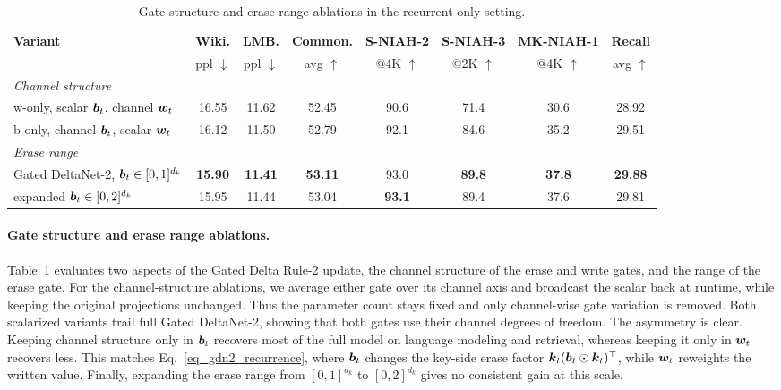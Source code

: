 \documentclass[10pt, logo, onecolumn, copyright]{nv}
\begin{document}
\begin{table}[t]
\centering
\footnotesize
\addtolength{\tabcolsep}{-1.5pt}
\begin{tabular}{l|cc|c|ccc|c}
\toprule
\textbf{Variant} & \textbf{Wiki.} & \textbf{LMB.} & \textbf{Common.} &
\textbf{S-NIAH-2} & \textbf{S-NIAH-3} & \textbf{MK-NIAH-1} & \textbf{Recall} \\
 & ppl $\downarrow$ & ppl $\downarrow$ & avg $\uparrow$ &
@4K $\uparrow$ & @2K $\uparrow$ & @4K $\uparrow$ & avg $\uparrow$ \\
\midrule
\multicolumn{8}{l}{\emph{Channel structure}} \\
w-only, scalar ${\bm{b}}_t$, channel ${\bm{w}}_t$   & 16.55 & 11.62 & 52.45 & 90.6 & 71.4 & 30.6 & 28.92 \\
b-only, channel ${\bm{b}}_t$, scalar ${\bm{w}}_t$   & 16.12 & 11.50 & 52.79 & 92.1 & 84.6 & 35.2 & 29.51 \\
\midrule
\multicolumn{8}{l}{\emph{Erase range}} \\
Gated DeltaNet-2, ${\bm{b}}_t \in [0,1]^{d_k}$     & \textbf{15.90} & \textbf{11.41} & \textbf{53.11} & 93.0 & \textbf{89.8} & \textbf{37.8} & \textbf{29.88} \\
\hspace{2mm} expanded ${\bm{b}}_t \in [0,2]^{d_k}$ & 15.95 & 11.44 & 53.04 & \textbf{93.1} & 89.4 & 37.6 & 29.81 \\
\bottomrule
\end{tabular}
\addtolength{\tabcolsep}{1.5pt}
\vspace{4pt}
\caption{
Gate structure and erase range ablations in the recurrent-only setting.
}
\label{tab_ablation}
\end{table}

\paragraph{Gate structure and erase range ablations.}
\label{para_ablation}

Table~\ref{tab_ablation} evaluates two aspects of the Gated Delta Rule-2 update, the channel structure of the erase and write gates, and the range of the erase gate. For the channel-structure ablations, we average either gate over its channel axis and broadcast the scalar back at runtime, while keeping the original projections unchanged. Thus the parameter count stays fixed and only channel-wise gate variation is removed. Both scalarized variants trail full Gated DeltaNet-2, showing that both gates use their channel degrees of freedom. The asymmetry is clear. Keeping channel structure only in ${\bm{b}}_t$ recovers most of the full model on language modeling and retrieval, whereas keeping it only in ${\bm{w}}_t$ recovers less. This matches Eq.~\ref{eq_gdn2_recurrence}, where ${\bm{b}}_t$ changes the key-side erase factor ${\bm{k}}_t({\bm{b}}_t\odot{\bm{k}}_t)^\top$, while ${\bm{w}}_t$ reweights the written value. Finally, expanding the erase range from $[0,1]^{d_k}$ to $[0,2]^{d_k}$ gives no consistent gain at this scale.
\end{document}
